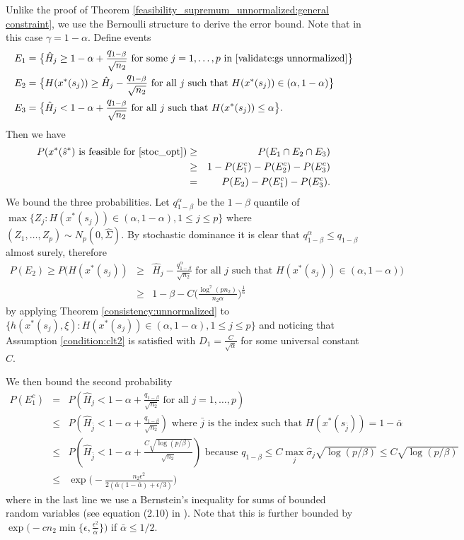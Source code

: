 \documentclass[mnsc,blindrev]{informs4} %
\begin{document}
Unlike the proof of Theorem \ref{feasibility_supremum_unnormalized:general constraint}, we use the Bernoulli structure to derive the error bound. Note that in this case $\gamma=1-\alpha$. Define events
\begin{align*}
E_1&=\big\{\hat H_j\geq 1-\alpha + \frac{ q_{1-\beta}}{\sqrt{n_2}}\text{ for some }j=1,\ldots,p\text{ in \eqref{validate:gs unnormalized}}\big\}\\
E_2&=\big\{H(x^*(s_j))\geq\hat H_j-  \frac{ q_{1-\beta}}{\sqrt{n_2}}\text{ for all $j$ such that }H(x^*(s_j))\in(\alpha,1-\alpha)\big\}\\
E_3&=\big\{\hat H_j<1-\alpha + \frac{ q_{1-\beta}}{\sqrt{n_2}}\text{ for all $j$ such that }H(x^*(s_j))\leq \alpha\big\}.
\end{align*}
Then we have
\begin{eqnarray}
\notag P(x^*(\hat s^*)\text{ is feasible for \eqref{stoc_opt}})&\geq& P(E_1\cap E_2\cap E_3)\\
\notag&\geq&1-P(E_1^c)-P(E_2^c)-P(E_3^c)\\
&=&P(E_2)-P(E_1^c)-P(E_3^c).\label{three probability bounds}
\end{eqnarray}
We bound the three probabilities. Let $q^{\alpha}_{1-\beta}$ be the $1-\beta$ quantile of $\max\{Z_j:H(x^*(s_j))\in(\alpha,1-\alpha),1\leq j\leq p\}$ where $(Z_1,\ldots,Z_p)\sim N_p(0,\hat\Sigma)$. By stochastic dominance it is clear that $q^{\alpha}_{1-\beta}\leq q_{1-\beta}$ almost surely, therefore
\begin{eqnarray*}
P(E_2)\geq P\big(H(x^*(s_j))&\geq&\hat H_j-  \frac{ q^{\alpha}_{1-\beta}}{\sqrt{n_2}}\text{ for all $j$ such that }H(x^*(s_j))\in(\alpha,1-\alpha)\big)\\
&\geq&1-\beta-C\Big(\frac{\log^7(pn_2)}{n_2\alpha}\Big)^{\frac{1}{6}}
\end{eqnarray*}
by applying Theorem \ref{consistency:unnormalized} to $\{h(x^*(s_j),\xi):H(x^*(s_j))\in(\alpha,1-\alpha),1\leq j\leq p\}$ and noticing that Assumption \ref{condition:clt2} is satisfied with $D_1=\frac{C}{\sqrt \alpha}$ for some universal constant $C$.

We then bound the second probability
\begin{eqnarray*}
P(E_1^c)&=&P(\hat H_j< 1-\alpha + \frac{ q_{1-\beta}}{\sqrt{n_2}}\text{ for all }j=1,\ldots,p)\\
&\leq&P(\hat H_{\bar{j}}< 1-\alpha + \frac{ q_{1-\beta}}{\sqrt{n_2}})\text{\ \ where $\bar{j}$ is the index such that }H(x^*(s_{\bar{j}}))=1-\bar{\alpha}\\
&\leq &P(\hat H_{\bar{j}}< 1-\alpha + \frac{C\sqrt{\log(p/\beta)}}{\sqrt{n_2}})\text{\ \ because }q_{1-\beta}\leq C\max_{j}\hat{\sigma}_j\sqrt{\log(p/\beta)}\leq C\sqrt{\log(p/\beta)}\\
&\leq&\exp\big(-\frac{n_2\epsilon^2}{2(\bar{\alpha}(1-\bar{\alpha})+\epsilon/3)}\big)
\end{eqnarray*}
where in the last line we use a Bernstein's inequality for sums of bounded random variables (see equation (2.10) in \cite{boucheron2013concentration}). Note that this is further bounded by $\exp\big(-cn_2\min\{\epsilon,\frac{\epsilon^2}{\bar{\alpha}}\}\big)$ if $\bar{\alpha}\leq 1/2$.
\end{document}
